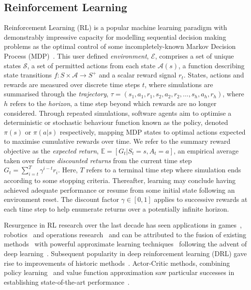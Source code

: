 \documentclass[conference,compsoc]{IEEEtran}
\begin{document}
\subsection{Reinforcement Learning}
Reinforcement Learning (RL) is a popular machine learning paradigm with demonstrably impressive capacity for modelling sequential decision making problems as the optimal control of some incompletely-known Markov Decision Process (MDP)~\cite{sutton2018reinforcement}. This user defined \textit{environment}, $\mathcal{E}$, comprises a set of unique states $\mathcal{S}$, a set of permitted actions from each state $\mathcal{A}(s)$, a function describing state transitions $f : S \times \mathcal{A} \to S^{+}$ and a scalar reward signal $r_t$. States, actions and rewards are measured over discrete time steps $t$, where simulations are summarised through the \textit{trajectory}, $\tau = (s_1, a_1, r_1,  s_2, a_2, r_2,...,s_h, a_h, r_h)$, where $h$ refers to the \textit{horizon}, a time step beyond which rewards are no longer considered. Through repeated simulations, software agents aim to optimise a deterministic or stochastic behaviour function known as the policy, denoted $\pi(s)$ or  $\pi(a|s)$ respectively, mapping MDP states to optimal actions expected to maximise cumulative rewards over time. We refer to the summary reward objective as the \textit{expected return}, $\mathbb{E}=[G_t | S_t = s, A_t = a]$, an empirical average taken over future \textit{discounted returns} from the current time step $G_{t} = \sum_{i=t}^{T}\gamma^{i-t}r_{i}$. Here, $T$ refers to a terminal time step where simulation ends according to some stopping criteria. Thereafter, learning may conclude having achieved adequate performance or resume from some initial state following an environment reset. The discount factor $\gamma \in [0,1]$ applies to successive rewards at each time step to help enumerate returns over a potentially infinite horizon. 

Resurgence in RL research over the last decade has seen applications in games~\cite{schaul2015prioritized, silver2016mastering, vinyals2019grandmaster}, robotics~\cite{gu2017deep, bloesch2022towards} and operations research~\cite{mazyavkina2021reinforcement} and can be attributed to the fusion of existing methods~\cite{watkins1992q} with powerful approximate learning techniques~\cite{lecun2015deep} following the advent of deep learning~\cite{mnih2013playing}. Subsequent popularity in deep reinforcement learning (DRL) gave rise to improvements of historic methods~\cite{schulman2017trust}. Actor-Critic methods, combining policy learning~\cite{kakade2001natural} and value function approximation saw particular successes in establishing state-of-the-art performance~\cite{schulman2017proximal}.
\end{document}
